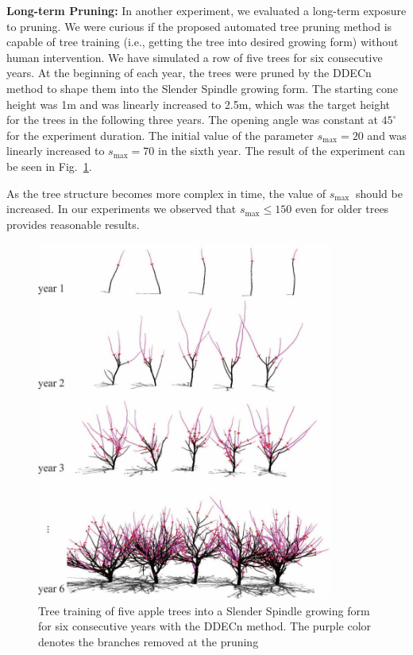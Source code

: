 \noindent\textbf{Long-term Pruning:} In another experiment, we evaluated a
long-term exposure to pruning. We were curious if the proposed automated tree pruning method is capable of tree training (i.e., getting the tree into desired growing form) without human intervention. We have
simulated a row of five trees for six consecutive years. At the
beginning of each year, the trees were pruned by the DDECn method to shape
them into the Slender Spindle growing form. The starting cone height was
1m and was linearly increased to 2.5m, which was the target height for
the trees in the following three years. The opening angle was constant
at $45^\circ$ for the experiment duration. The initial value of the parameter
\(s_{\mathrm{\max}}=20\) and was linearly increased to \(s_{\mathrm{\max}}=70\) in
the sixth year. The result of the experiment can be seen in Fig.~\ref{fig:my_figure7}.

As the tree structure becomes more complex in time, the
value of \(s_{\mathrm{\max}}\ \) should be increased. In our experiments
we observed that \(s_{\mathrm{\max}}\leq{150}\) even
for older trees provides reasonable results.
\begin{figure}[hbt]
    \centering
    \includegraphics[width=3.84333in,height=4.66333in]{figs/image7.jpeg}
    \caption{Tree training of five apple trees into a Slender
Spindle growing form for six consecutive years with the DDECn method.
The purple color denotes the branches removed at the pruning}
    \label{fig:my_figure7}
\end{figure}


